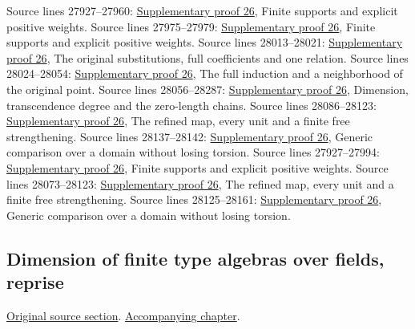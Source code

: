 \begin{AlgebraSourceRoutes}
 Source lines 27927--27960: \hyperlink{algebra_noether_dimension_notes_20260928}{Supplementary proof 26}, Finite supports and explicit positive weights.
 Source lines 27975--27979: \hyperlink{algebra_noether_dimension_notes_20260928}{Supplementary proof 26}, Finite supports and explicit positive weights.
 Source lines 28013--28021: \hyperlink{algebra_noether_dimension_notes_20260928}{Supplementary proof 26}, The original substitutions, full coefficients and one relation.
 Source lines 28024--28054: \hyperlink{algebra_noether_dimension_notes_20260928}{Supplementary proof 26}, The full induction and a neighborhood of the original point.
 Source lines 28056--28287: \hyperlink{algebra_noether_dimension_notes_20260928}{Supplementary proof 26}, Dimension, transcendence degree and the zero-length chains.
 Source lines 28086--28123: \hyperlink{algebra_noether_dimension_notes_20260928}{Supplementary proof 26}, The refined map, every unit and a finite free strengthening.
 Source lines 28137--28142: \hyperlink{algebra_noether_dimension_notes_20260928}{Supplementary proof 26}, Generic comparison over a domain without losing torsion.
 Source lines 27927--27994: \hyperlink{algebra_noether_dimension_notes_20260928}{Supplementary proof 26}, Finite supports and explicit positive weights.
 Source lines 28073--28123: \hyperlink{algebra_noether_dimension_notes_20260928}{Supplementary proof 26}, The refined map, every unit and a finite free strengthening.
 Source lines 28125--28161: \hyperlink{algebra_noether_dimension_notes_20260928}{Supplementary proof 26}, Generic comparison over a domain without losing torsion.
\end{AlgebraSourceRoutes}

\subsection{Dimension of finite type algebras over fields, reprise}
\hypertarget{algebra-source-section-dimension-finite-type-algebras-reprise}{}
\noindent\href{https://github.com/stacks/stacks-project/blob/a04446e57ec1fbc252a871afcec7752fb2807b14/algebra.tex\#L28167}{Original source section}. \href{algebra.pdf\#nameddest=section-dimension-finite-type-algebras-reprise}{Accompanying chapter}.

